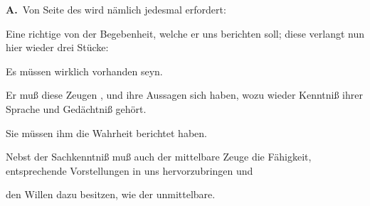 \vabst \textbf{A.}~Von Seite des  wird nämlich jedesmal erfordert:
\begin{aufza}
\item Eine richtige  von der Begebenheit, welche er uns berichten soll; diese verlangt nun hier wieder drei Stücke:
\begin{aufzb}
\item Es müssen  wirklich vorhanden seyn.
\item Er muß diese Zeugen , und ihre Aussagen sich  haben, wozu wieder Kenntniß ihrer Sprache und Gedächtniß gehört.
\item Sie müssen ihm die Wahrheit berichtet haben.
\end{aufzb}
\item Nebst der Sachkenntniß muß auch der mittelbare Zeuge die Fähigkeit, entsprechende Vorstellungen in uns hervorzubringen und
\item den Willen dazu besitzen, wie der unmittelbare.
\end{aufza}\par

